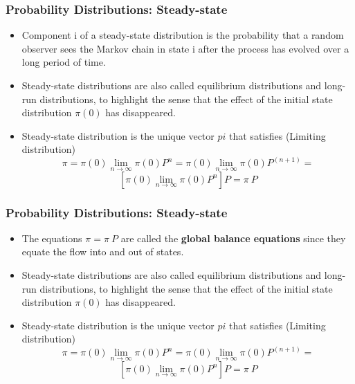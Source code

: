 \begin{frame}
    \frametitle{Probability Distributions: Steady-state}
        \begin{itemize}
            \item Component i of a steady-state distribution is the probability that a random observer sees the Markov 
            chain in state i after the process has evolved over a long period of time.


            \item Steady-state distributions are also called equilibrium distributions and long-run distributions, to 
            highlight the sense that the effect of the initial state distribution $\pi(0)$ has disappeared.


            \item Steady-state distribution is the unique vector $pi$ that satisfies (Limiting distribution)
            \small
            $$\pi = \pi(0)\lim_{n \to\infty}\pi(0)P^n = \pi(0)\lim_{n \to\infty}\pi(0)P^(n+1) = $$
            $$\left[\pi(0)\lim_{n \to\infty}\pi(0)P^n\right]P = \pi~P$$

        \end{itemize}
\end{frame}


\begin{frame}
    \frametitle{Probability Distributions: Steady-state}
        \begin{itemize}
            \item The equations $\pi = \pi~P$ are called the \textbf{global balance equations} since they
            equate the flow into and out of states.
            
            


            \item Steady-state distributions are also called equilibrium distributions and long-run distributions, to 
            highlight the sense that the effect of the initial state distribution $\pi(0)$ has disappeared.


            \item Steady-state distribution is the unique vector $pi$ that satisfies (Limiting distribution)
            \small
            $$\pi = \pi(0)\lim_{n \to\infty}\pi(0)P^n = \pi(0)\lim_{n \to\infty}\pi(0)P^(n+1) = $$
            $$\left[\pi(0)\lim_{n \to\infty}\pi(0)P^n\right]P = \pi~P$$

        \end{itemize}
\end{frame}



